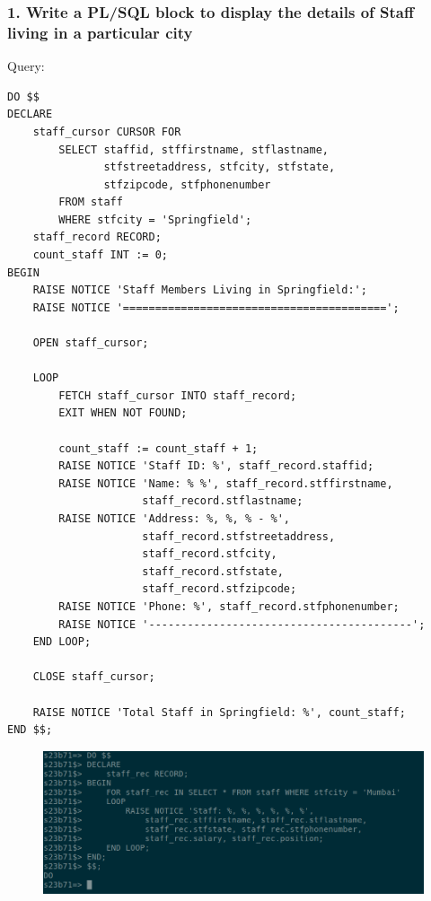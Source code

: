 \documentclass{article}
\begin{document}
\subsubsection*{1. Write a PL/SQL block to display the details of Staff living in a particular city}
Query:
\begin{Verbatim}[frame=single,framerule=1pt,fontfamily=courier,fontsize=\small]
DO $$
DECLARE
    staff_cursor CURSOR FOR 
        SELECT staffid, stffirstname, stflastname, 
               stfstreetaddress, stfcity, stfstate, 
               stfzipcode, stfphonenumber
        FROM staff
        WHERE stfcity = 'Springfield';
    staff_record RECORD;
    count_staff INT := 0;
BEGIN
    RAISE NOTICE 'Staff Members Living in Springfield:';
    RAISE NOTICE '=========================================';
    
    OPEN staff_cursor;
    
    LOOP
        FETCH staff_cursor INTO staff_record;
        EXIT WHEN NOT FOUND;
        
        count_staff := count_staff + 1;
        RAISE NOTICE 'Staff ID: %', staff_record.staffid;
        RAISE NOTICE 'Name: % %', staff_record.stffirstname, 
                     staff_record.stflastname;
        RAISE NOTICE 'Address: %, %, % - %', 
                     staff_record.stfstreetaddress,
                     staff_record.stfcity,
                     staff_record.stfstate,
                     staff_record.stfzipcode;
        RAISE NOTICE 'Phone: %', staff_record.stfphonenumber;
        RAISE NOTICE '-----------------------------------------';
    END LOOP;
    
    CLOSE staff_cursor;
    
    RAISE NOTICE 'Total Staff in Springfield: %', count_staff;
END $$;
\end{Verbatim}
\begin{figure}[H]
    \centering
    \includegraphics[width=\textwidth]{cycle6/6-4.png}
\end{figure}
\end{document}
